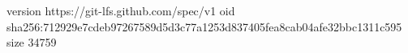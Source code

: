version https://git-lfs.github.com/spec/v1
oid sha256:712929e7cdeb97267589d5d3c77a1253d837405fea8cab04afe32bbc1311c595
size 34759
